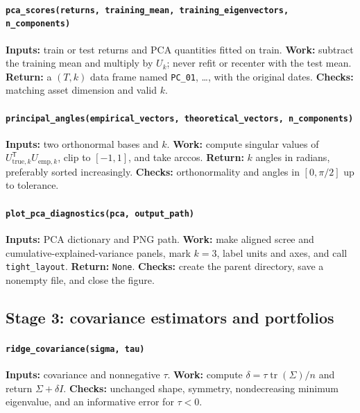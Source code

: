 \documentclass[10pt]{article}
\newcommand{\trans}{^{\mathsf T}}
\begin{document}
\begin{sloppypar}
\paragraph{\texttt{pca\_scores(returns, training\_mean,
training\_eigenvectors, n\_components)}}
\textbf{Inputs:} train or test returns and PCA quantities fitted on train.
\textbf{Work:} subtract the training mean and multiply by $U_k$; never refit or
recenter with the test mean. \textbf{Return:} a $(T,k)$ data frame named
\texttt{PC\_01}, \ldots, with the original dates.
\textbf{Checks:} matching asset dimension and valid $k$.

\paragraph{\texttt{principal\_angles(empirical\_vectors,
theoretical\_vectors, n\_components)}}
\textbf{Inputs:} two orthonormal bases and $k$.
\textbf{Work:} compute singular values of
$U_{\mathrm{true},k}\trans U_{\mathrm{emp},k}$, clip to $[-1,1]$, and take
arccos. \textbf{Return:} $k$ angles in radians, preferably sorted increasingly.
\textbf{Checks:} orthonormality and angles in $[0,\pi/2]$ up to tolerance.

\paragraph{\texttt{plot\_pca\_diagnostics(pca, output\_path)}}
\textbf{Inputs:} PCA dictionary and PNG path.
\textbf{Work:} make aligned scree and cumulative-explained-variance panels,
mark $k=3$, label units and axes, and call \texttt{tight\_layout}.
\textbf{Return:} \texttt{None}. \textbf{Checks:} create the parent directory,
save a nonempty file, and close the figure.

\subsection*{Stage 3: covariance estimators and portfolios}

\paragraph{\texttt{ridge\_covariance(sigma, tau)}}
\textbf{Inputs:} covariance and nonnegative $\tau$.
\textbf{Work:} compute
$\delta=\tau\operatorname{tr}(\Sigma)/n$ and return $\Sigma+\delta I$.
\textbf{Checks:} unchanged shape, symmetry, nondecreasing minimum eigenvalue,
and an informative error for $\tau<0$.


\end{sloppypar}
\end{document}
